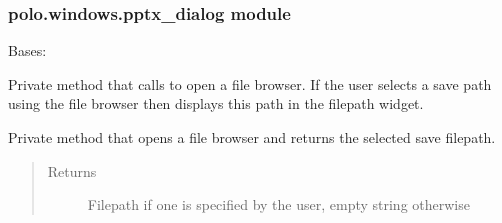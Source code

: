 \documentclass[letterpaper,10pt,english]{sphinxmanual}
\begin{document}
\subsubsection{polo.windows.pptx\_dialog module}
\label{\detokenize{polo.windows:module-polo.windows.pptx_dialog}}\label{\detokenize{polo.windows:polo-windows-pptx-dialog-module}}

\begin{fulllineitems}
\label{\detokenize{polo.windows:polo.windows.pptx_dialog.PptxDesignerDialog}}
Bases: 

\begin{fulllineitems}
\label{\detokenize{polo.windows:polo.windows.pptx_dialog.PptxDesignerDialog._browse_and_update_line_edit}}
Private method that calls 
to open a file browser. If the user selects a save path using the file
browser then displays this path in the filepath  widget.

\end{fulllineitems}


\begin{fulllineitems}
\label{\detokenize{polo.windows:polo.windows.pptx_dialog.PptxDesignerDialog._get_save_path}}
Private method that opens a file browser and returns the selected
save filepath.
\begin{quote}\begin{description}
\item[{Returns}] \leavevmode
Filepath if one is specified by the user, empty string otherwise


\end{description}
\end{quote}
\end{fulllineitems}
\end{fulllineitems}
\end{document}
